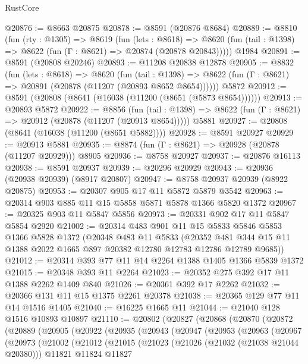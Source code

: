 \begin{lexlean}{RustCore}
\begin{coremodule}
@20876 := @8663 @20875
@20878 := @8591 (@20876 @8684)
@20889 := @8810
    (fun (rty : @1305) =>
    @8619
      (fun (lets : @8618) =>
      @8620 (fun (tail : @1398) => @8622 (fun (Γ : @8621) => @20874 (@20878 @20843)))))
    @1984
@20891 := @8591 (@20808 @20246)
@20893 := @11208 @20838 @12878
@20905 := @8832
    (fun (lets : @8618) =>
    @8620
      (fun (tail : @1398) =>
      @8622 (fun (Γ : @8621) => @20891 (@20878 (@11207 (@20893 @8652 @8654))))))
    @5872
@20912 := @8591 (@20808 (@8641 (@16038 (@11200 (@8651 (@5873 @8654))))))
@20913 := @20893 @5872
@20922 := @8856
    (fun (tail : @1398) => @8622 (fun (Γ : @8621) => @20912 (@20878 (@11207 (@20913 @8654)))))
    @5881
@20927 := @20808 (@8641 (@16038 (@11200 (@8651 @5882))))
@20928 := @8591 @20927
@20929 := @20913 @5881
@20935 := @8874 (fun (Γ : @8621) => @20928 (@20878 (@11207 @20929))) @8905
@20936 := @8758 @20927
@20937 := @20876 @16113
@20938 := @8591 @20937
@20939 := @20296 @20929
@20943 := @20936 (@20938 @20939) (@8917 @20807)
@20947 := @8758 @20937 @20939 (@8922 @20875)
@20953 := @20307 @905 @17 @11 @5872 @5879 @3542
@20963 := @20314 @903 @885 @11 @15 @5858 @5871 @5878 @1366 @5820 @1372
@20967 := @20325 @903 @11 @5847 @5856
@20973 := @20331 @902 @17 @11 @5847 @5854 @2920
@21002 := @20314
    @483
    @901
    @11
    @15
    @5833
    @5846
    @5853
    @1366
    @5828
    @1372
    (@20348
      @483
      @11
      @5833
      (@20352 @481 @344 @15 @11 @1388 @2022 @1665 @897 @20382 @12780 @12783 @12786 @12789 @9685))
@21012 := @20314 @393 @77 @11 @14 @2264 @1388 @1405 @1366 @5839 @1372
@21015 := @20348 @393 @11 @2264
@21023 := @20352 @275 @392 @17 @11 @1388 @2262 @1409 @840
@21026 := @20361 @392 @17 @2262
@21032 := @20366 @131 @11 @15 @1375 @2261 @20378
@21038 := @20365 @129 @77 @11 @14 @1516 @1405
@21040 := @16225 @1665 @11
@21044 := @21040 @128 @1516 @10893 @10897
@21110 := @20802
    (@20827
      (@20868
        (@20870
          (@20872
            (@20889
              (@20905
                (@20922
                  (@20935
                    (@20943
                      (@20947
                        (@20953
                          (@20963
                            (@20967
                              (@20973
                                (@21002
                                  (@21012
                                    (@21015
                                      (@21023
                                        (@21026 (@21032 (@21038 @21044 @20380)))
                                        @11821
                                        @11824
                                        @11827

\end{coremodule}
\end{lexlean}
